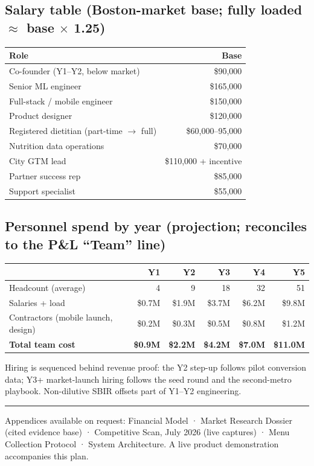 \documentclass[10pt]{article}
\begin{document}
\subsection*{Salary table \normalfont\small\color{muted}(Boston-market base; fully loaded $\approx$ base $\times$ 1.25)}

\begin{tabularx}{\textwidth}{@{}L r@{}}
\toprule
\textbf{Role} & \textbf{Base}\\
\midrule
Co-founder (Y1--Y2, below market) & \$90{,}000\\
Senior ML engineer & \$165{,}000\\
Full-stack / mobile engineer & \$150{,}000\\
Product designer & \$120{,}000\\
Registered dietitian (part-time $\to$ full) & \$60{,}000--95{,}000\\
Nutrition data operations & \$70{,}000\\
City GTM lead & \$110{,}000 + incentive\\
Partner success rep & \$85{,}000\\
Support specialist & \$55{,}000\\
\bottomrule
\end{tabularx}

\subsection*{Personnel spend by year \normalfont\small\color{muted}(projection; reconciles to the P\&L ``Team'' line)}

\begin{tabularx}{\textwidth}{@{}L r r r r r@{}}
\toprule
 & \textbf{Y1} & \textbf{Y2} & \textbf{Y3} & \textbf{Y4} & \textbf{Y5}\\
\midrule
Headcount (average) & 4 & 9 & 18 & 32 & 51\\
Salaries + load & \$0.7M & \$1.9M & \$3.7M & \$6.2M & \$9.8M\\
Contractors (mobile launch, design) & \$0.2M & \$0.3M & \$0.5M & \$0.8M & \$1.2M\\
\midrule
\textbf{Total team cost} & \textbf{\$0.9M} & \textbf{\$2.2M} & \textbf{\$4.2M} & \textbf{\$7.0M} & \textbf{\$11.0M}\\
\bottomrule
\end{tabularx}

\vspace{4pt}
Hiring is sequenced behind revenue proof: the Y2 step-up follows pilot conversion data; Y3+ market-launch hiring follows the seed round and the second-metro playbook. Non-dilutive SBIR offsets part of Y1--Y2 engineering.

\vspace{14pt}
{\color{ground}\hrule height 2pt}
\vspace{6pt}
{\small\color{muted}Appendices available on request: Financial Model · Market Research Dossier (cited evidence base) · Competitive Scan, July 2026 (live captures) · Menu Collection Protocol · System Architecture. A live product demonstration accompanies this plan.}
\end{document}
